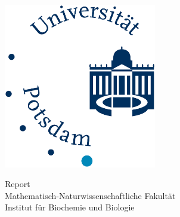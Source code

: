 
\begin{titlepage}
    \begin{center}
        {\LARGE  

        \hfill

        \vfill

        {} \\ \bigskip

        {\color{Maroon}} 

        }

        \vfill

        \includegraphics[width=0.5\textwidth]{Frontpage/Mathnatlogo} \\ \bigskip

	 \vfill

		Report\\
		Mathematisch-Naturwissenschaftliche Fakult\"{a}t\\
		Institut für Biochemie und Biologie\\


        \vfill                      

    \end{center}        
\end{titlepage} 